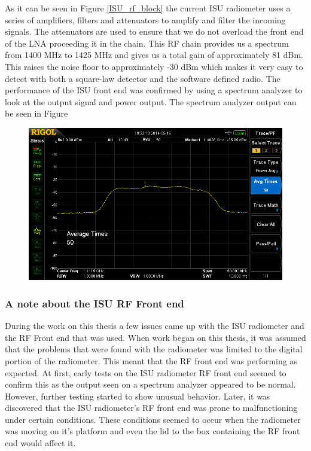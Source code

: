 As it can be seen in Figure \ref{ISU_rf_block} the current ISU radiometer uses a series of amplifiers, filters and attenuators to amplify and filter the incoming signals.  The attenuators are used to ensure that we do not overload the front end of the LNA proceeding it in the chain.  This RF chain provides us a spectrum from 1400 MHz to 1425 MHz and gives us a total gain of approximately 81 dBm.  This raises the noise floor to approximately -30 dBm which makes it very easy to detect with both a square-law detector and the software defined radio.  The performance of the ISU front end was confirmed by using a spectrum analyzer to look at the output signal and power output.  The spectrum analyzer output can be seen in Figure 

{\begin{figure}[h!tb] 
\centering
\includegraphics[width=17cm]{Images/radlidoff.png}
\label{ISU_rf_spectrum}
\end{figure}
}

\subsubsection{A note about the ISU RF Front end}

During the work on this thesis a few issues came up with the ISU radiometer and the RF Front end that was used.  When work began on this thesis, it was assumed that the problems that were found with the radiometer was limited to the digital portion of the radiometer.  This meant that the RF front end was performing as expected.  At first, early tests on the ISU radiometer RF front end seemed to confirm this as the output seen on a spectrum analyzer appeared to be normal.  However, further testing started to show unusual behavior.  Later, it was discovered that the ISU radiometer's RF front end was prone to malfunctioning under certain conditions.  These conditions seemed to occur when the radiometer was moving on it's platform and even the lid to the box containing the RF front end would affect it.  

